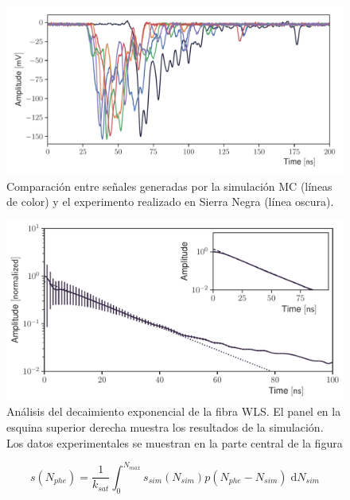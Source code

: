 \begin{figure}
        \centering
        \includegraphics[width=\textwidth]{muon-pulse.pdf}
        \caption{Comparación entre señales generadas por la simulación MC (líneas de color) y el experimento realizado en Sierra Negra (línea oscura).}
        \label{fig:muon-pulse}
\end{figure}

\begin{figure}
        \centering
        \includegraphics[width=\textwidth]{muons-tail-fit.pdf}
        \caption{Análisis del decaimiento exponencial de la fibra WLS. El panel en la esquina superior derecha muestra los resultados de la simulación. Los datos experimentales se muestran en la parte central de la figura}
        \label{fig:muons-tail}
\end{figure}

\begin{equation}
\label{equ:nphe}
s(N_{phe})=\frac{1}{k_{sat}}\int_{0}^{N_{max}} s_{sim}(N_{sim})p(N_{phe}-N_{sim})\;\mathrm{d}N_{sim}
\end{equation}

